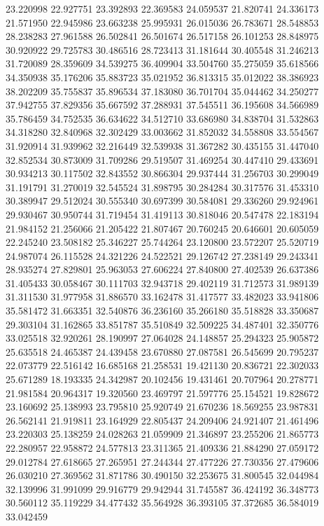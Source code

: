 23.220998
22.927751
23.392893
22.369583
24.059537
21.820741
24.336173
21.571950
22.945986
23.663238
25.995931
26.015036
26.783671
28.548853
28.238283
27.961588
26.502841
26.501674
26.517158
26.101253
28.848975
30.920922
29.725783
30.486516
28.723413
31.181644
30.405548
31.246213
31.720089
28.359609
34.539275
36.409904
33.504760
35.275059
35.618566
34.350938
35.176206
35.883723
35.021952
36.813315
35.012022
38.386923
38.202209
35.755837
35.896534
37.183080
36.701704
35.044462
34.250277
37.942755
37.829356
35.667592
37.288931
37.545511
36.195608
34.566989
35.786459
34.752535
36.634622
34.512710
33.686980
34.838704
31.532863
34.318280
32.840968
32.302429
33.003662
31.852032
34.558808
33.554567
31.920914
31.939962
32.216449
32.539938
31.367282
30.435155
31.447040
32.852534
30.873009
31.709286
29.519507
31.469254
30.447410
29.433691
30.934213
30.117502
32.843552
30.866304
29.937444
31.256703
30.299049
31.191791
31.270019
32.545524
31.898795
30.284284
30.317576
31.453310
30.389947
29.512024
30.555340
30.697399
30.584081
29.336260
29.924961
29.930467
30.950744
31.719454
31.419113
30.818046
20.547478
22.183194
21.984152
21.256066
21.205422
21.807467
20.760245
20.646601
20.605059
22.245240
23.508182
25.346227
25.744264
23.120800
23.572207
25.520719
24.987074
26.115528
24.321226
24.522521
29.126742
27.238149
29.243341
28.935274
27.829801
25.963053
27.606224
27.840800
27.402539
26.637386
31.405433
30.058467
30.111703
32.943718
29.402119
31.712573
31.989139
31.311530
31.977958
31.886570
33.162478
31.417577
33.482023
33.941806
35.581472
31.663351
32.540876
36.236160
35.266180
35.518828
33.350687
29.303104
31.162865
33.851787
35.510849
32.509225
34.487401
32.350776
33.025518
32.920261
28.190997
27.064028
24.148857
25.294323
25.905872
25.635518
24.465387
24.439458
23.670880
27.087581
26.545699
20.795237
22.073779
22.516142
16.685168
21.258531
19.421130
20.836721
22.302033
25.671289
18.193335
24.342987
20.102456
19.431461
20.707964
20.278771
21.981584
20.964317
19.320560
23.469797
21.597776
25.154521
19.828672
23.160692
25.138993
23.795810
25.920749
21.670236
18.569255
23.987831
26.562141
21.919811
23.164929
22.805437
24.209406
24.921407
21.461496
23.220303
25.138259
24.028263
21.059909
21.346897
23.255206
21.865773
22.280957
22.958872
24.577813
23.311365
21.409336
21.884290
27.059172
29.012784
27.618665
27.265951
27.244344
27.477226
27.730356
27.479606
26.030210
27.369562
31.871786
30.490150
32.253675
31.800545
32.044984
32.139996
31.991099
29.916779
29.942944
31.745587
36.424192
36.348773
30.560112
35.119229
34.477432
35.564928
36.393105
37.372685
36.584019
33.042459

